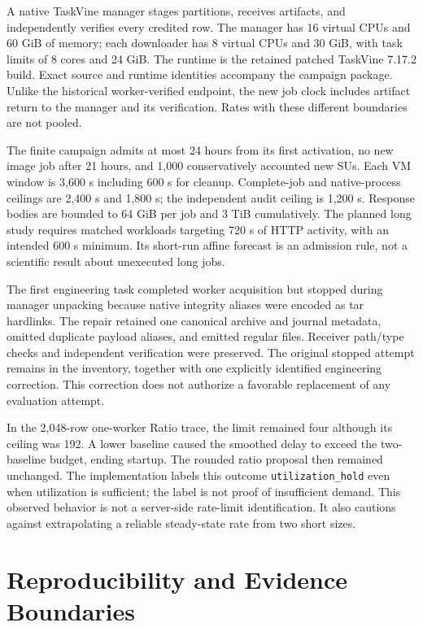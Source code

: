 \documentclass[10pt]{article}
\begin{document}
A native TaskVine manager stages partitions, receives artifacts, and independently verifies every credited row. The manager has 16 virtual CPUs and 60 GiB of memory; each downloader has 8 virtual CPUs and 30 GiB, with task limits of 8 cores and 24 GiB. The runtime is the retained patched TaskVine 7.17.2 build. Exact source and runtime identities accompany the campaign package. Unlike the historical worker-verified endpoint, the new job clock includes artifact return to the manager and its verification. Rates with these different boundaries are not pooled.

The finite campaign admits at most 24 hours from its first activation, no new image job after 21 hours, and 1,000 conservatively accounted new SUs. Each VM window is 3,600 s including 600 s for cleanup. Complete-job and native-process ceilings are 2,400 s and 1,800 s; the independent audit ceiling is 1,200 s. Response bodies are bounded to 64 GiB per job and 3 TiB cumulatively. The planned long study requires matched workloads targeting 720 s of HTTP activity, with an intended 600 s minimum. Its short-run affine forecast is an admission rule, not a scientific result about unexecuted long jobs.

The first engineering task completed worker acquisition but stopped during manager unpacking because native integrity aliases were encoded as tar hardlinks. The repair retained one canonical archive and journal metadata, omitted duplicate payload aliases, and emitted regular files. Receiver path/type checks and independent verification were preserved. The original stopped attempt remains in the inventory, together with one explicitly identified engineering correction. This correction does not authorize a favorable replacement of any evaluation attempt.



In the 2,048-row one-worker Ratio trace, the limit remained four although its ceiling was 192. A lower baseline caused the smoothed delay to exceed the two-baseline budget, ending startup. The rounded ratio proposal then remained unchanged. The implementation labels this outcome \texttt{utilization\_hold} even when utilization is sufficient; the label is not proof of insufficient demand. This observed behavior is not a server-side rate-limit identification. It also cautions against extrapolating a reliable steady-state rate from two short sizes.

\section{Reproducibility and Evidence Boundaries}
\end{document}
